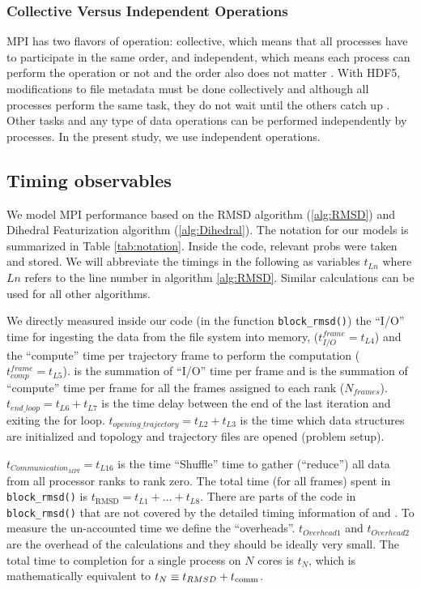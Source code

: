 \subsubsection{Collective Versus Independent Operations} 
MPI has two flavors of operation: collective, which means that all processes have to participate in the same order, and independent, which means each process can perform the operation or not and the order also does not matter  \cite{pythonhdf5}.
With HDF5, modifications to file metadata must be done collectively and although all processes perform the same task, they do not wait until the others catch up \cite{pythonhdf5}. 
Other tasks and any type of data operations can be performed independently by processes.
In the present study, we use independent operations.

\subsection{Timing observables}
We model MPI performance based on the RMSD algorithm (\ref{alg:RMSD}) and Dihedral Featurization algorithm (\ref{alg:Dihedral}). 
The notation for our models is summarized in Table \ref{tab:notation}.
Inside the code, relevant probs were taken and stored. 
We will abbreviate the timings in the following as variables $t_{Ln}$ where $Ln$ refers to the line number in algorithm \ref{alg:RMSD}.
Similar calculations can be used for all other algorithms.

We directly measured inside our code (in the function \texttt{block\_rmsd()}) the ``I/O'' time for
ingesting the data from the file system into memory, ($t_{I/O}^{frame} = t_{L4}$) and the ``compute'' time per
trajectory frame to perform the computation ($t_{comp}^{frame} = t_{L5}$). 
 \tIO is the summation of ``I/O'' time per frame and \tcomp is the summation of ``compute'' time per frame for all the frames assigned to each rank ($N_{frames}$). 
$t_{end\_loop} = t_{L6}+t_{L7}$ is the time delay between the end of the last iteration and exiting the for loop.
$t_{opening\_trajectory} = t_{L2}+t_{L3}$ is the time which data structures are initialized and topology and trajectory files are opened (problem setup).

$t_{Communication_{MPI}} = t_{L16}$ is the time ``Shuffle'' time to gather (``reduce'') all data from all processor ranks to rank zero.
The total time (for all frames) spent in \texttt{block\_rmsd()} is $t_{\text{RMSD}} = t_{L1} + ...+ t_{L8}$. 
There are parts of the code in \texttt{block\_rmsd()} that are not covered by the detailed timing information of \tcomp and \tIO. 
To measure the un-accounted time we define the ``overheads''.
$t_{Overhead1}$ and $t_{Overhead2}$ are the overhead of the calculations and they should be ideally very small.  
The total time to completion for a single process on $N$ cores is $t_{N}$, which is mathematically equivalent to
$t_{N} \equiv t_{RMSD} + t_{\text{comm}}$.

